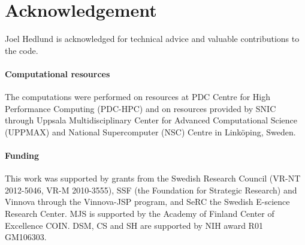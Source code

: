 \documentclass{bioinfo}
\begin{document}
\section*{Acknowledgement}
Joel Hedlund is acknowledged for technical advice and valuable contributions to the code. 

\paragraph{Computational resources\textcolon}
The computations were performed on resources at PDC Centre for High
Performance Computing (PDC-HPC) and on resources provided by SNIC
through Uppsala Multidisciplinary Center for Advanced Computational
Science (UPPMAX) and National Supercomputer (NSC) Centre in Link\"oping,
Sweden.

\paragraph{Funding\textcolon} This work was supported by grants from
the Swedish Research Council (VR-NT 2012-5046, VR-M 2010-3555), SSF
(the Foundation for Strategic Research) and Vinnova through the
Vinnova-JSP program, and SeRC the Swedish E-science Research Center.
MJS is supported by the Academy of Finland Center of Excellence COIN.
DSM, CS and SH are supported by NIH award R01 GM106303.


%
%
%
%
%
%
%

\end{document}
